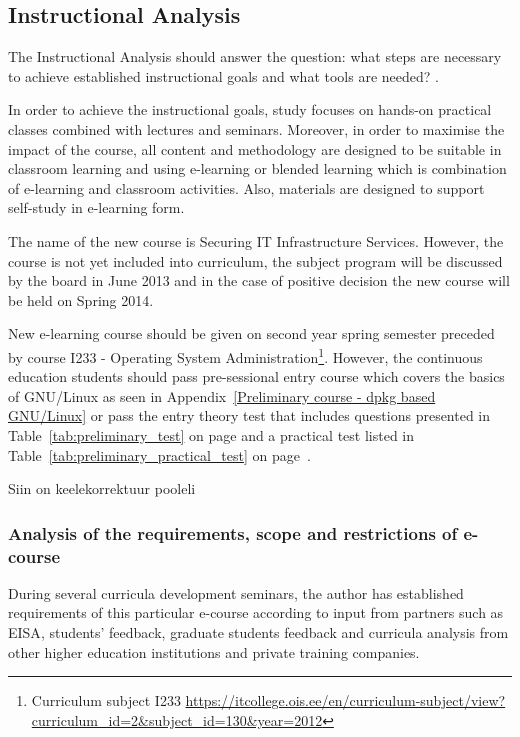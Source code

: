 \subsection{Instructional Analysis}
The Instructional Analysis should answer the question: what steps are necessary to achieve  established instructional goals and what tools are needed? \citep{website:addie}.

In order to achieve the instructional  goals, study focuses on hands-on practical classes combined with lectures and seminars. Moreover, in order to maximise the impact of the course, all content and methodology are designed to be suitable in classroom learning and using e-learning or blended learning which is combination of e-learning and classroom activities. Also, materials are designed to support self-study in e-learning form.

The name of the new course is Securing IT Infrastructure Services. However, the course is not yet included into curriculum, the subject program will be discussed by the board in June 2013 and in the case of positive decision the new course will be held on Spring 2014.

New e-learning course should be given on second year spring semester preceded by course I233 - Operating System Administration\footnote{Curriculum subject I233 \url{https://itcollege.ois.ee/en/curriculum-subject/view?curriculum_id=2&subject_id=130&year=2012}}. However, the continuous education students should pass pre-sessional entry course which covers the basics of GNU/Linux as seen in Appendix~\ref{Preliminary course - dpkg based GNU/Linux} or pass the entry theory test that includes questions presented in Table~\ref{tab:preliminary_test} on page \pageref{tab:preliminary_test} and a practical test listed in Table~\ref{tab:preliminary_practical_test} on page~\pageref{tab:preliminary_practical_test}.

{\color{red} Siin on keelekorrektuur pooleli }
\subsubsection{Analysis of the requirements, scope and restrictions of e-course}
During several curricula development seminars, the author has established  requirements of this particular e-course according to input from partners such as \gls{EISA}, students' feedback, graduate students feedback and curricula analysis from other higher education institutions and private training companies. 

